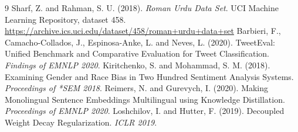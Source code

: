 \documentclass[11pt,a4paper]{article}
\begin{document}
\begin{thebibliography}{9}
 Sharf, Z. and Rahman, S. U. (2018). \emph{Roman Urdu Data Set}. UCI Machine
  Learning Repository, dataset 458. \url{https://archive.ics.uci.edu/dataset/458/roman+urdu+data+set}
 Barbieri, F., Camacho-Collados, J., Espinosa-Anke, L. and Neves, L. (2020).
  TweetEval: Unified Benchmark and Comparative Evaluation for Tweet Classification.
  \emph{Findings of EMNLP 2020}.
 Kiritchenko, S. and Mohammad, S. M. (2018). Examining Gender and Race Bias in Two
  Hundred Sentiment Analysis Systems. \emph{Proceedings of *SEM 2018}.
 Reimers, N. and Gurevych, I. (2020). Making Monolingual Sentence Embeddings
  Multilingual using Knowledge Distillation. \emph{Proceedings of EMNLP 2020}.
 Loshchilov, I. and Hutter, F. (2019). Decoupled Weight Decay Regularization.
  \emph{ICLR 2019}.
\end{thebibliography}
\end{document}
